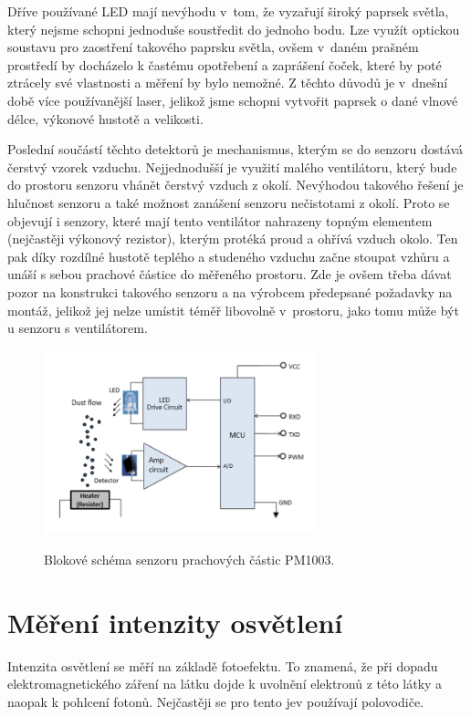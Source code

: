 Dříve používané LED mají nevýhodu v~tom, že vyzařují široký paprsek světla, který nejsme schopni jednoduše soustředit do jednoho bodu. Lze využít optickou soustavu pro zaostření takového paprsku světla, ovšem v~daném prašném prostředí by docházelo k častému opotřebení a zaprášení čoček, které by poté ztrácely své vlastnosti a měření by bylo nemožné. Z těchto důvodů je v~dnešní době více používanější laser, jelikož jsme schopni vytvořit paprsek o dané vlnové délce, výkonové hustotě a velikosti. 

Poslední součástí těchto detektorů je mechanismus, kterým se do senzoru dostává čerstvý vzorek vzduchu. Nejjednodušší je využití malého ventilátoru, který bude do prostoru senzoru vhánět čerstvý vzduch z okolí. Nevýhodou takového řešení je hlučnost senzoru a také možnost zanášení senzoru nečistotami z okolí. Proto se objevují i senzory, které mají tento ventilátor nahrazeny topným elementem (nejčastěji výkonový rezistor), kterým protéká proud a ohřívá vzduch okolo. Ten pak díky rozdílné hustotě teplého a studeného vzduchu začne stoupat vzhůru a unáší s sebou prachové částice do měřeného prostoru. Zde je ovšem třeba dávat pozor na konstrukci takového senzoru a na výrobcem předepsané požadavky na montáž, jelikož jej nelze umístit téměř libovolně v~prostoru, jako tomu může být u senzoru s ventilátorem.

\begin{figure}
    \includegraphics[width=0.70\textwidth]{obrazky/dustSensorPrinciple.png}
    \label{fig_dustSensorPrinciple}
    \caption{Blokové schéma senzoru prachových částic PM1003. \cite{PM1003Datasheet}}
\end{figure}

\section{Měření intenzity osvětlení}

Intenzita osvětlení se měří na základě fotoefektu. To znamená, že při dopadu elektromagnetického záření na látku dojde k uvolnění elektronů z této látky a naopak k pohlcení fotonů. Nejčastěji se pro tento jev používají polovodiče.

